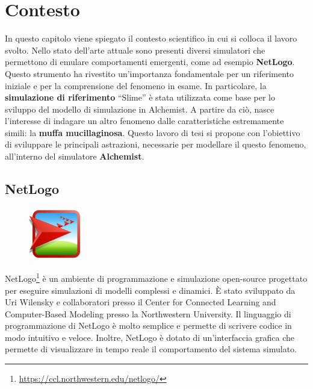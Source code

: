 \chapter{Contesto}
In questo capitolo viene spiegato il contesto scientifico in cui si colloca il lavoro svolto.
Nello stato dell'arte attuale sono presenti diversi simulatori che permettono di emulare comportamenti emergenti, come ad esempio \textbf{NetLogo}.
Questo strumento ha rivestito un'importanza fondamentale per un riferimento iniziale e per la comprensione del fenomeno in esame.
In particolare, la \textbf{simulazione di riferimento} ``Slime'' è stata utilizzata come base per lo sviluppo del modello di simulazione in Alchemist.
A partire da ciò, nasce l'interesse di indagare un altro fenomeno dalle caratteristiche estremamente simili: la \textbf{muffa mucillaginosa}.
Questo lavoro di tesi si propone con l'obiettivo di sviluppare le principali astrazioni, necessarie per modellare il questo fenomeno,
all'interno del simulatore \textbf{Alchemist}.

\section{NetLogo}

\begin{figure}
    \centering
    \includegraphics[width=0.2\textwidth]{figures/net.png}
\end{figure}

NetLogo\footnote{\url{https://ccl.northwestern.edu/netlogo/}}\space\cite{wilensky1997netlogo} è un ambiente di programmazione e simulazione open-source
progettato per eseguire simulazioni di modelli complessi e dinamici. È stato sviluppato da Uri Wilensky
e collaboratori presso il Center for Connected Learning and Computer-Based Modeling presso la Northwestern University.
Il linguaggio di programmazione di NetLogo è molto semplice e permette di scrivere codice in modo
intuitivo e veloce. Inoltre, NetLogo è dotato di un'interfaccia grafica che permette di visualizzare
in tempo reale il comportamento del sistema simulato. 

